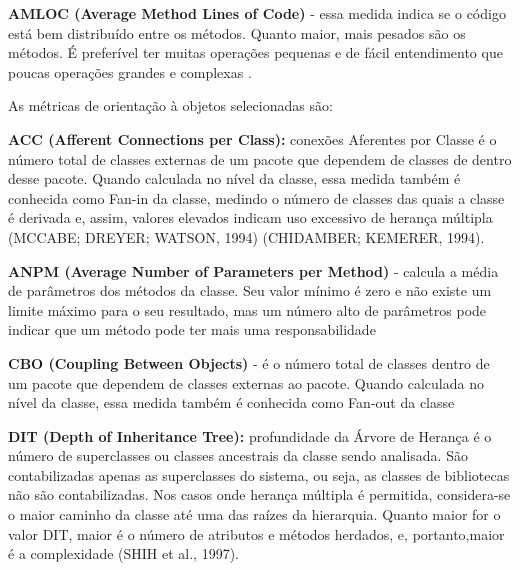  \vspace{\onelineskip}

\textbf{AMLOC (Average Method Lines of Code)} - essa medida indica se o código está bem distribuído entre os métodos. Quanto maior, mais pesados são os métodos. É preferível ter muitas operações pequenas e de fácil entendimento que poucas operações grandes e complexas \cite{Meirelles2013}.



 \vspace{\onelineskip} 

As métricas de orientação à objetos selecionadas são:

\textbf{ACC (Afferent Connections per Class):} conexões Aferentes por Classe é o número
total de classes externas de um pacote que dependem de classes de dentro desse
pacote. Quando calculada no nível da classe, essa medida também é conhecida como
Fan-in da classe, medindo o número de classes das quais a classe é derivada e, assim,
valores elevados indicam uso excessivo de herança múltipla (MCCABE; DREYER;
WATSON, 1994) (CHIDAMBER; KEMERER, 1994).

 \vspace{\onelineskip} 

 \textbf{ANPM (Average Number of Parameters per Method)} - calcula a média de parâmetros dos métodos da classe. Seu valor mínimo é zero e não existe um limite máximo para o seu resultado, mas um número alto de parâmetros pode indicar que um método pode ter mais uma responsabilidade \cite{Basili1987}


 \vspace{\onelineskip} 

\textbf{CBO (Coupling Between Objects)} -  é o número total de classes dentro de um pacote que dependem de classes externas ao pacote. Quando calculada no nível da classe, essa medida também é conhecida como Fan-out da classe \cite{Chidamber94}

 \vspace{\onelineskip} 

\textbf{DIT (Depth of Inheritance Tree):} profundidade da Árvore de Herança é o número
de superclasses ou classes ancestrais da classe sendo analisada. São contabilizadas
apenas as superclasses do sistema, ou seja, as classes de bibliotecas não são
contabilizadas. Nos casos onde herança múltipla é permitida, considera-se o maior
caminho da classe até uma das raízes da hierarquia. Quanto maior for o valor DIT,
maior é o número de atributos e métodos herdados, e, portanto,maior é a complexidade
(SHIH et al., 1997).

